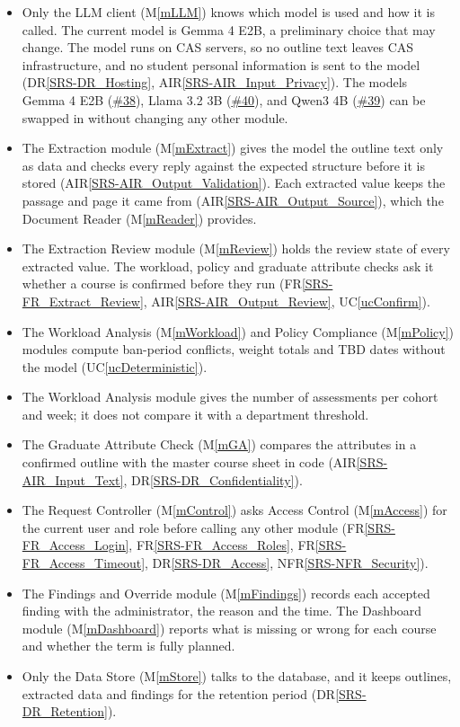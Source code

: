 \documentclass[12pt, titlepage]{article}
\newcommand{\uref}[1]{UC\ref{#1}}
\newcommand{\mref}[1]{M\ref{#1}}
\newcommand{\frref}[1]{FR\ref{SRS-#1}}
\newcommand{\nfrref}[1]{NFR\ref{SRS-#1}}
\newcommand{\drref}[1]{DR\ref{SRS-#1}}
\newcommand{\airref}[1]{AIR\ref{SRS-#1}}
\newcommand{\issue}[1]{\href{https://github.com/shivyam/cas-course-optimization/issues/#1}{\##1}}
\begin{document}

\begin{itemize}
\item Only the LLM client (\mref{mLLM}) knows which model is used and how it is called. The current model
  is Gemma 4 E2B, a preliminary choice that may change. The model runs on CAS
  servers, so no outline text leaves CAS infrastructure, and no student
  personal information is sent to the model (\drref{DR_Hosting},
  \airref{AIR_Input_Privacy}). The models Gemma 4 E2B (\issue{38}), Llama 3.2 3B (\issue{40}),
  and Qwen3 4B (\issue{39}) can be swapped in without changing any other module.
\item The Extraction module (\mref{mExtract}) gives the model the outline text only as data and checks
  every reply against the expected structure before it is stored
  (\airref{AIR_Output_Validation}). Each extracted value keeps the passage and
  page it came from (\airref{AIR_Output_Source}), which the Document Reader
  (\mref{mReader}) provides.
\item The Extraction Review module (\mref{mReview}) holds the review state of every extracted
  value. The workload, policy and graduate attribute checks ask it whether a
  course is confirmed before they run (\frref{FR_Extract_Review},
  \airref{AIR_Output_Review}, \uref{ucConfirm}).
\item The Workload Analysis (\mref{mWorkload}) and Policy Compliance (\mref{mPolicy}) modules
  compute ban-period conflicts, weight totals and TBD dates without the model
  (\uref{ucDeterministic}).
\item The Workload Analysis module gives the number of assessments per cohort and 
week; it does not compare it with a department threshold.
\item The Graduate Attribute Check (\mref{mGA}) compares the attributes in a confirmed 
outline with the master course sheet in code (\airref{AIR_Input_Text},
  \drref{DR_Confidentiality}).
\item The Request Controller (\mref{mControl}) asks Access Control (\mref{mAccess}) for the
  current user and role before calling any other module (\frref{FR_Access_Login}, 
  \frref{FR_Access_Roles}, \frref{FR_Access_Timeout}, \drref{DR_Access}, \nfrref{NFR_Security}).
\item The Findings and Override module (\mref{mFindings}) records each accepted 
finding with the administrator, the reason and the time. The Dashboard module
  (\mref{mDashboard}) reports what is missing or wrong for each course and
  whether the term is fully planned.
\item Only the Data Store (\mref{mStore}) talks to the database, and it keeps 
outlines, extracted data and findings for the retention period (\drref{DR_Retention}).
\end{itemize}
\end{document}
